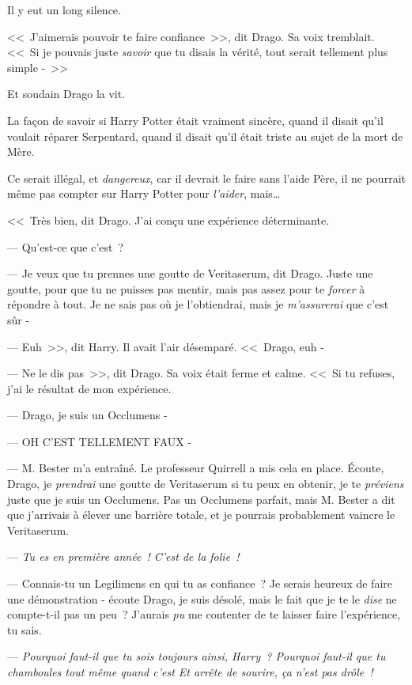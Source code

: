 Il y eut un long silence.

<<~J'aimerais pouvoir te faire confiance~>>, dit Drago. Sa voix tremblait. <<~Si je pouvais juste \emph{savoir} que tu disais la vérité, tout serait tellement plus simple -~>>

Et soudain Drago la vit.

La façon de savoir si Harry Potter était vraiment sincère, quand il disait qu'il voulait réparer Serpentard, quand il disait qu'il était triste au sujet de la mort de Mère.

Ce serait illégal, et \emph{dangereux}, car il devrait le faire sans l'aide Père, il ne pourrait même pas compter sur Harry Potter pour \emph{l'aider}, mais…

<<~Très bien, dit Drago. J'ai conçu une expérience déterminante.

--- Qu'est-ce que c'est~?

--- Je veux que tu prennes une goutte de Veritaserum, dit Drago. Juste une goutte, pour que tu ne puisses pas mentir, mais pas assez pour te \emph{forcer} à répondre à tout. Je ne sais pas où je l'obtiendrai, mais je \emph{m'assurerai} que c'est sûr -

--- Euh~>>, dit Harry. Il avait l'air désemparé. <<~Drago, euh -

--- Ne le dis pas~>>, dit Drago. Sa voix était ferme et calme. <<~Si tu refuses, j'ai le résultat de mon expérience.

--- Drago, je suis un Occlumens -

--- OH C'EST TELLEMENT FAUX -

--- M. Bester m'a entraîné. Le professeur Quirrell a mis cela en place. Écoute, Drago, je \emph{prendrai} une goutte de Veritaserum si tu peux en obtenir, je te \emph{préviens} juste que je suis un Occlumens. Pas un Occlumens parfait, mais M. Bester a dit que j'arrivais à élever une barrière totale, et je pourrais probablement vaincre le Veritaserum.

--- \emph{Tu es en première année~! C'est de la folie~!}

--- Connais-tu un Legilimens en qui tu as confiance~? Je serais heureux de faire une démonstration - écoute Drago, je suis désolé, mais le fait que je te le \emph{dise} ne compte-t-il pas un peu~? J'aurais \emph{pu} me contenter de te laisser faire l'expérience, tu sais.

--- \emph{ Pourquoi faut-il que tu sois toujours ainsi, Harry~? Pourquoi faut-il que tu chamboules tout même quand c'est  Et arrête de sourire, ça n'est pas drôle~!}

